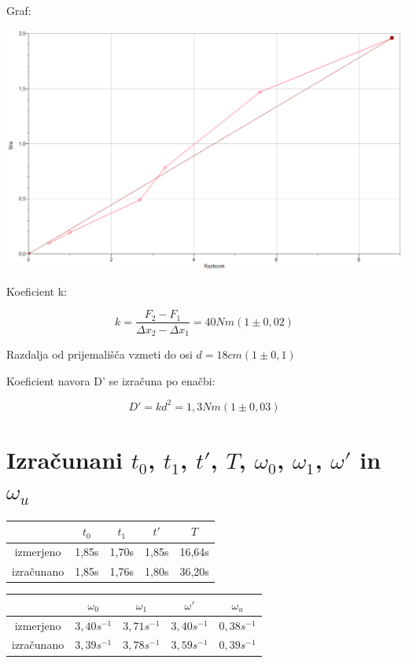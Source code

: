 \documentclass[a4paper]{report}
\begin{document}
Graf:

\includegraphics[width=\textwidth]{KoeficientK}

Koeficient k:

\[
  k = \frac{F_2 - F_1}{\Delta x_2 - \Delta x_1} = 40Nm (1 \pm 0,02)
\]

Razdalja od prijemališča vzmeti do osi $d = 18 cm (1 \pm 0,1)$

Koeficient navora D' se izračuna po enačbi:

\[
  D' = kd^2 = 1,3 Nm (1 \pm 0,03)
\]

\section*{Izračunani $t_0$, $ t_1$, $ t'$, $ T$, $\omega_0$, $\omega_1$, $\omega'$ in $ \omega_u$}

\begin{center}
  \begin{tabular}{| c | c | c | c | c |}
    \hline
    & $t_0$ & $t_1$ & $t'$ & $T$ \\ \hline
    izmerjeno & 1,85s & 1,70s & 1,85s & 16,64s \\ \hline
    izračunano & 1,85s & 1,76s & 1,80s & 36,20s \\ 
    \hline
  \end{tabular}
\end{center}

\begin{center}
  \begin{tabular}{| c | c | c | c | c |}
    \hline
    &  $\omega_0$ & $\omega_1$ & $\omega'$ & $\omega_u$ \\ \hline
    izmerjeno & $3,40s^{-1}$ & $3,71s^{-1}$ & $3,40s^{-1}$ & $0,38s^{-1}$ \\ \hline
    izračunano & $3,39s^{-1}$ & $3,78s^{-1}$ & $3,59s^{-1}$ & $0,39s^{-1}$ \\
    \hline
  \end{tabular}
\end{center}
\end{document}
